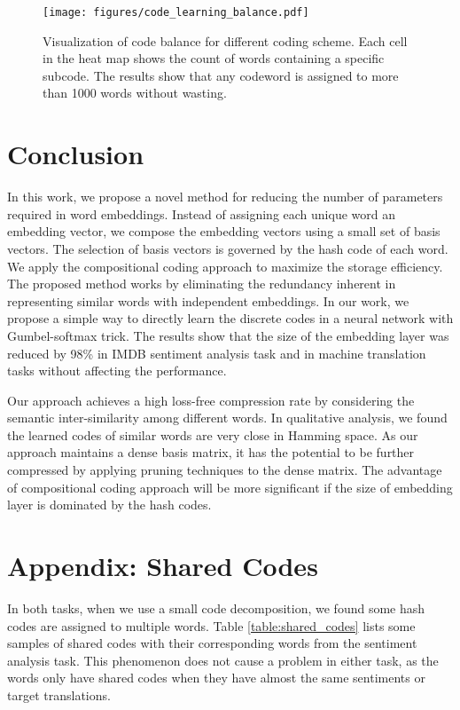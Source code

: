 \documentclass{article} \usepackage{iclr2018_conference_review,times}
\begin{document}
\begin{figure}[h]
  \centering
  \texttt{[image: figures/code\_learning\_balance.pdf]}
  \caption{Visualization of code balance for different coding scheme. Each cell in the heat map shows the count of words containing a specific subcode. The results show that any codeword is assigned to more than 1000 words without wasting. }
  \label{fig:balance}
\end{figure}


\section{Conclusion}

In this work, we propose a novel method for reducing the number of parameters required in word embeddings. Instead of assigning each unique word an embedding vector, we compose the embedding vectors using a small set of basis vectors. The selection of basis vectors is governed by the hash code of each word. We apply the compositional coding approach to maximize the storage efficiency. The proposed method works by eliminating the redundancy inherent in representing similar words with independent embeddings. In our work, we propose a simple way to directly learn the discrete codes in a neural network with Gumbel-softmax trick. The results show that the size of the embedding layer was reduced by 98\% in IMDB sentiment analysis task and  in machine translation tasks without affecting the performance.

Our approach achieves a high loss-free compression rate by considering the semantic inter-similarity among different words. In qualitative analysis, we found the learned codes of similar words are very close in Hamming space. As our approach maintains a dense basis matrix, it has the potential to be further compressed by applying pruning techniques to the dense matrix. The advantage of compositional coding approach will be more significant if the size of embedding layer is dominated by the hash codes.




\clearpage
\appendix

\section{Appendix: Shared Codes}

In both tasks, when we use a small code decomposition, we found some hash codes are assigned to multiple words. Table \ref{table:shared_codes} lists some samples of shared codes with their corresponding words from the sentiment analysis task. This phenomenon does not cause a problem in either task, as the words only have shared codes when they have almost the same sentiments or target translations. 
\end{document}

